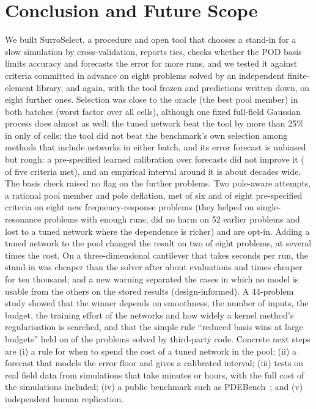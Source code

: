 \section{Conclusion and Future Scope}\label{sec:conclusion}
We built SurroSelect, a procedure and open tool that chooses a stand-in for a slow simulation by cross-validation, reports ties, checks whether the POD basis limits accuracy and forecasts the error for more runs, and we tested it against criteria committed in advance on eight problems solved by an independent finite-element library, and again, with the tool frozen and predictions written down, on eight further ones. Selection was close to the oracle (the best pool member) in both batches (worst factor \SvpSoneMax{} over all \SvpSoneN{} cells), although one fixed full-field Gaussian process does almost as well; the tuned network beat the tool by more than 25\% in only \SvpSfourK{} of \SvpSfourN{} cells; the tool did not beat the benchmark's own selection among methods that include networks in either batch, and its error forecast is unbiased but rough: a pre-specified learned calibration over \SfAllCases{} forecasts did not improve it (\SfMetCount{} of five criteria met), and an empirical interval around it is about \SfPhWEighty{} decades wide. The basis check raised no flag on the further problems. Two pole-aware attempts, a rational pool member and pole deflation, met \SrMetCount{} of six and \SdMetCount{} of eight pre-specified criteria on eight new frequency-response problems (they helped on single-resonance problems with enough runs, did no harm on 52 earlier problems and lost to a tuned network where the dependence is richer) and are opt-in. Adding a tuned network to the pool changed the result on two of eight problems, at several times the cost. On a three-dimensional cantilever that takes \SeTsim{} seconds per run, the stand-in was cheaper than the solver after about \SeBreakWith{} evaluations and \SeSpeedup{} times cheaper for ten thousand; and a new warning separated the cases in which no model is usable from the others on the stored results (design-informed). A 44-problem study showed that the winner depends on smoothness, the number of inputs, the budget, the training effort of the networks and how widely a kernel method's regularisation is searched, and that the simple rule ``reduced basis wins at large budgets'' held on \SvpPtK{} of the \SvpPtN{} problems solved by third-party code.
Concrete next steps are (i) a rule for when to spend the cost of a tuned network in the pool; (ii) a forecast that models the error floor and gives a calibrated interval; (iii) tests on real field data from simulations that take minutes or hours, with the full cost of the simulations included; (iv) a public benchmark such as PDEBench~\cite{takamoto2022}; and (v) independent human replication.
